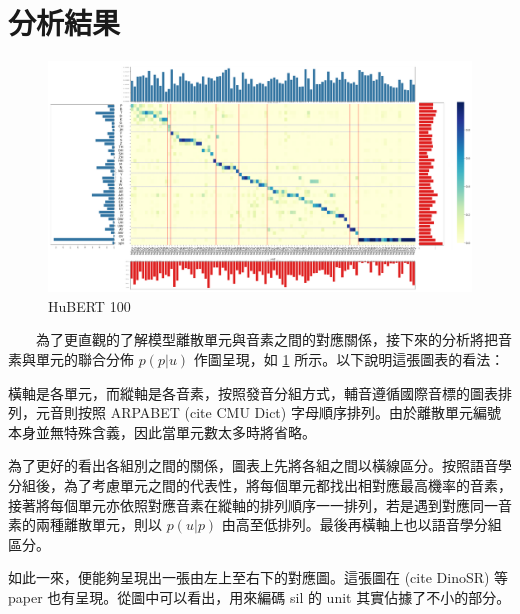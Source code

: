 \section{分析結果}

\begin{figure}
    \centering
    \includegraphics[width=1\linewidth]{figures/better__p_ph_given_un.png}
    \caption{HuBERT 100}
    \label{p_p_given_u-hub-100}
\end{figure}

　　為了更直觀的了解模型離散單元與音素之間的對應關係，接下來的分析將把音素與單元的聯合分佈 \(p(p|u)\) 作圖呈現，如 \ref{p_p_given_u-hub-100} 所示。以下說明這張圖表的看法：\par
       橫軸是各單元，而縱軸是各音素，按照發音分組方式，輔音遵循國際音標的圖表排列，元音則按照 ARPABET (cite CMU Dict) 字母順序排列。由於離散單元編號本身並無特殊含義，因此當單元數太多時將省略。\par
       為了更好的看出各組別之間的關係，圖表上先將各組之間以橫線區分。按照語音學分組後，為了考慮單元之間的代表性，將每個單元都找出相對應最高機率的音素，接著將每個單元亦依照對應音素在縱軸的排列順序一一排列，若是遇到對應同一音素的兩種離散單元，則以 \(p(u|p) \) 由高至低排列。最後再橫軸上也以語音學分組區分。\par
       如此一來，便能夠呈現出一張由左上至右下的對應圖。這張圖在 (cite DinoSR) 等 paper 也有呈現。從圖中可以看出，用來編碼 sil 的 unit 其實佔據了不小的部分。